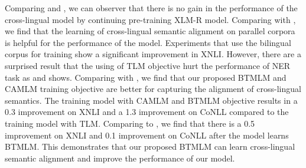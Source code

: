 \documentclass[11pt]{article}
\begin{document}
\renewcommand\arraystretch{0.9}
\begin{table}[!h]
\centering
\vskip 0.1in

\vskip -0.05in
\caption{Ablation study on each task in \textsc{Ernie-M}.}
\label{table4}
\end{table}

\renewcommand\arraystretch{0.5}
\begin{table}[!h]
\centering
\vskip 0.1in

\vskip -0.05in
\caption{Cross-lingual transfer gap score, smaller gap indicates better transferability.}
\label{table5}
\end{table}

Comparing  and , we can observer that there is no gain in the performance of the cross-lingual model by continuing pre-training XLM-R model. Comparing    with , we find that the learning of cross-lingual semantic alignment on parallel corpora is helpful for the performance of the model. Experiments that use the bilingual corpus for training show a significant improvement in XNLI. However, there are a surprised result that the using of TLM objective hurt the performance of NER task as  and  shows. Comparing  with , we find that our proposed BTMLM and CAMLM training objective are better for capturing the alignment of cross-lingual semantics. The training model with CAMLM and BTMLM objective results in a 0.3 improvement on XNLI and a 1.3 improvement on CoNLL compared to the training model with TLM. Comparing  to , we find that there is a 0.5 improvement on XNLI and 0.1 improvement on CoNLL after the model learns BTMLM. This demonstrates that our proposed BTMLM can learn cross-lingual semantic alignment and improve the performance of our model.
\end{document}
